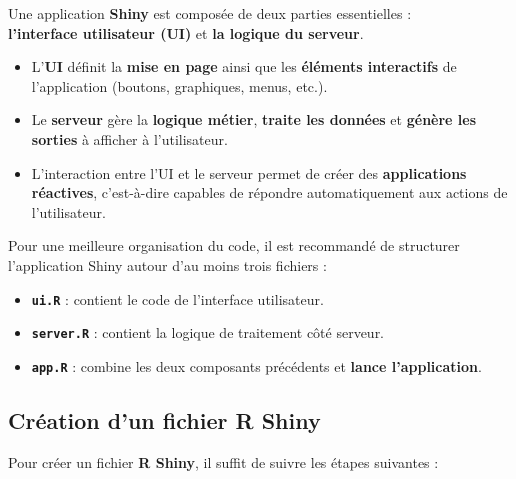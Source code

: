 \documentclass[
]{article}
\providecommand{\tightlist}{%
  \setlength{\itemsep}{0pt}\setlength{\parskip}{0pt}}
\begin{document}
Une application \textbf{Shiny} est composée de deux parties essentielles
:\\
\textbf{l'interface utilisateur (UI)} et \textbf{la logique du serveur}.

\begin{itemize}
\tightlist
\item
  L'\textbf{UI} définit la \textbf{mise en page} ainsi que les
  \textbf{éléments interactifs} de l'application (boutons, graphiques,
  menus, etc.).
\item
  Le \textbf{serveur} gère la \textbf{logique métier}, \textbf{traite
  les données} et \textbf{génère les sorties} à afficher à
  l'utilisateur.
\item
  L'interaction entre l'UI et le serveur permet de créer des
  \textbf{applications réactives}, c'est-à-dire capables de répondre
  automatiquement aux actions de l'utilisateur.
\end{itemize}

Pour une meilleure organisation du code, il est recommandé de structurer
l'application Shiny autour d'au moins trois fichiers :

\begin{itemize}
\tightlist
\item
  \textbf{\texttt{ui.R}} : contient le code de l'interface
  utilisateur.\\
\item
  \textbf{\texttt{server.R}} : contient la logique de traitement côté
  serveur.\\
\item
  \textbf{\texttt{app.R}} : combine les deux composants précédents et
  \textbf{lance l'application}.
\end{itemize}

\subsection{Création d'un fichier R
Shiny}\label{cruxe9ation-dun-fichier-r-shiny}

Pour créer un fichier \textbf{R Shiny}, il suffit de suivre les étapes
suivantes :
\end{document}
